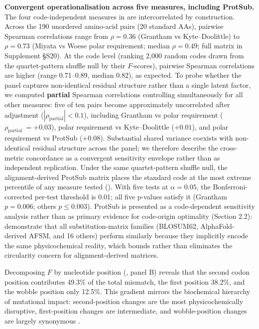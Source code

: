 \documentclass[preprint,11pt,authoryear,a4paper]{elsarticle}
\begin{document}
\textbf{Convergent operationalisation across five measures, including
ProtSub.} The four code-independent measures in  are
intercorrelated by construction. Across the 190 unordered amino-acid
pairs (20 standard AAs), pairwise Spearman correlations range from
\(\rho = 0.36\) (Grantham vs Kyte--Doolittle) to \(\rho = 0.73\) (Miyata
vs Woese polar requirement; median \(\rho = 0.49\); full matrix in
Supplement §S20). At the code level (ranking 2,000 random codes drawn
from the quartet-pattern shuffle null by their \(F\)-scores), pairwise
Spearman correlations are higher (range 0.71--0.89, median 0.82), as
expected. To probe whether the panel captures non-identical residual
structure rather than a single latent factor, we computed
\textbf{partial} Spearman correlations controlling simultaneously for
all other measures: five of ten pairs become approximately uncorrelated
after adjustment (\(\left| \rho_{\text{partial}} \right| < 0.1\)),
including Grantham vs polar requirement
(\(\rho_{\text{partial }} = + 0.03\)), polar requirement vs
Kyte--Doolittle (\(+ 0.01\)), and polar requirement vs ProtSub
(\(+ 0.08\)). Substantial shared variance coexists with non-identical
residual structure across the panel; we therefore describe the
cross-metric concordance as a convergent sensitivity envelope rather
than as independent replication. Under the same quartet-pattern shuffle
null, the alignment-derived ProtSub matrix \citep{jia2021} places the
standard code at the most extreme percentile of any measure tested
(). With five tests at \(\alpha = 0.05\), the
Bonferroni-corrected per-test threshold is 0.01; all five p-values
satisfy it (Grantham \(p = 0.006\); others \(p \leq 0.003\)). ProtSub is
presented as a code-dependent sensitivity analysis rather than as
primary evidence for code-origin optimality (Section 2.2):
\citep{buschmann2026} demonstrate that all substitution-matrix families
(BLOSUM62, AlphaFold-derived AFSM, and 16 others) perform similarly
because they implicitly encode the same physicochemical reality, which
bounds rather than eliminates the \citep{digiulio2001} circularity
concern for alignment-derived matrices.

Decomposing \(F\) by nucleotide position (,
panel B) reveals that the second codon position contributes 49.3\% of
the total mismatch, the first position 38.2\%, and the wobble position
only 12.5\%. This gradient mirrors the biochemical hierarchy of
mutational impact: second-position changes are the most
physicochemically disruptive, first-position changes are intermediate,
and wobble-position changes are largely synonymous
\citep{woese1965, freeland1998}.
\end{document}
